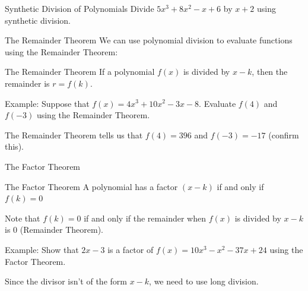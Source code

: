 \documentclass[t]{beamer}
\begin{document}
	\begin{frame}{Synthetic Division of Polynomials}
		Divide $5x^3 + 8x^2 - x + 6$ by $x+2$ using synthetic division.
		
	\end{frame}

	\begin{frame}{The Remainder Theorem}
	We can use polynomial division to evaluate functions using the Remainder Theorem:
	\begin{block}{The Remainder Theorem}
		If a polynomial $f(x)$ is divided by $x - k$, then the remainder is $r = f(k)$.
	\end{block}

	\pause

	Example: Suppose that $f(x) = 4x^3 + 10x^2 - 3x - 8$. Evaluate $f(4)$ and $f(-3)$ using the Remainder Theorem. 
	
	\pause
	
	 \pause {}
	
	\pause
	
	The Remainder Theorem tells us that $f(4)=396$ and $f(-3) = -17$ (confirm this).
	\end{frame}

	\begin{frame}{The Factor Theorem}
		\begin{block}{The Factor Theorem}
			A polynomial has a factor $(x-k)$ if and only if $f(k) = 0$
		\end{block}
	
		\pause Note that $f(k) = 0$ if and only if the remainder when $f(x)$ is divided by $x - k$ is $0$ (Remainder Theorem).
		
		\pause
		
		Example: Show that $2x-3$ is a factor of $f(x) = 10x^3 - x^2 - 37x + 24$ using the Factor Theorem.
		
		\pause
		
		Since the divisor isn't of the form $x - k$, we need to use long division.
	\end{frame}
\end{document}
